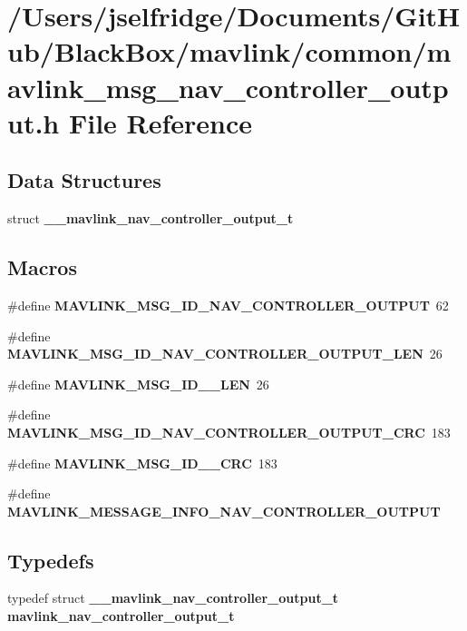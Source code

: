 \section{/\+Users/jselfridge/\+Documents/\+Git\+Hub/\+Black\+Box/mavlink/common/mavlink\+\_\+msg\+\_\+nav\+\_\+controller\+\_\+output.h File Reference}
\label{mavlink__msg__nav__controller__output_8h}
\subsection*{Data Structures}
\begin{DoxyCompactItemize}
\item 
struct \textbf{ \+\_\+\+\_\+mavlink\+\_\+nav\+\_\+controller\+\_\+output\+\_\+t}
\end{DoxyCompactItemize}
\subsection*{Macros}
\begin{DoxyCompactItemize}
\item 
\#define \textbf{ M\+A\+V\+L\+I\+N\+K\+\_\+\+M\+S\+G\+\_\+\+I\+D\+\_\+\+N\+A\+V\+\_\+\+C\+O\+N\+T\+R\+O\+L\+L\+E\+R\+\_\+\+O\+U\+T\+P\+UT}~62
\item 
\#define \textbf{ M\+A\+V\+L\+I\+N\+K\+\_\+\+M\+S\+G\+\_\+\+I\+D\+\_\+\+N\+A\+V\+\_\+\+C\+O\+N\+T\+R\+O\+L\+L\+E\+R\+\_\+\+O\+U\+T\+P\+U\+T\+\_\+\+L\+EN}~26
\item 
\#define \textbf{ M\+A\+V\+L\+I\+N\+K\+\_\+\+M\+S\+G\+\_\+\+I\+D\+\_\+\_\+\+L\+EN}~26
\item 
\#define \textbf{ M\+A\+V\+L\+I\+N\+K\+\_\+\+M\+S\+G\+\_\+\+I\+D\+\_\+\+N\+A\+V\+\_\+\+C\+O\+N\+T\+R\+O\+L\+L\+E\+R\+\_\+\+O\+U\+T\+P\+U\+T\+\_\+\+C\+RC}~183
\item 
\#define \textbf{ M\+A\+V\+L\+I\+N\+K\+\_\+\+M\+S\+G\+\_\+\+I\+D\+\_\+\_\+\+C\+RC}~183
\item 
\#define \textbf{ M\+A\+V\+L\+I\+N\+K\+\_\+\+M\+E\+S\+S\+A\+G\+E\+\_\+\+I\+N\+F\+O\+\_\+\+N\+A\+V\+\_\+\+C\+O\+N\+T\+R\+O\+L\+L\+E\+R\+\_\+\+O\+U\+T\+P\+UT}
\end{DoxyCompactItemize}
\subsection*{Typedefs}
\begin{DoxyCompactItemize}
\item 
typedef struct \textbf{ \+\_\+\+\_\+mavlink\+\_\+nav\+\_\+controller\+\_\+output\+\_\+t} \textbf{ mavlink\+\_\+nav\+\_\+controller\+\_\+output\+\_\+t}
\end{DoxyCompactItemize}



